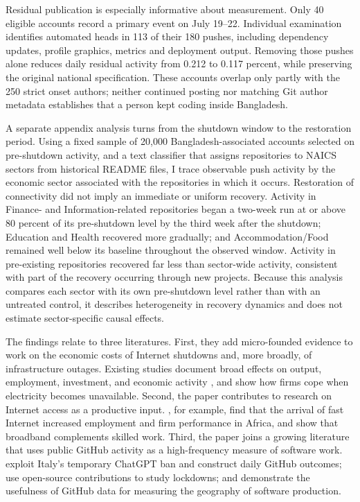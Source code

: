 Residual publication is especially informative about measurement. Only 40 eligible accounts record a primary event on July 19--22. Individual examination identifies automated heads in 113 of their 180 pushes, including dependency updates, profile graphics, metrics and deployment output. Removing those pushes alone reduces daily residual activity from 0.212 to 0.117 percent, while preserving the original national specification. These accounts overlap only partly with the 250 strict onset authors; neither continued posting nor matching Git author metadata establishes that a person kept coding inside Bangladesh.

A separate appendix analysis turns from the shutdown window to the restoration period. Using a fixed sample of 20,000 Bangladesh-associated accounts selected on pre-shutdown activity, and a text classifier that assigns repositories to NAICS sectors from historical README files, I trace observable push activity by the economic sector associated with the repositories in which it occurs. Restoration of connectivity did not imply an immediate or uniform recovery. Activity in Finance- and Information-related repositories began a two-week run at or above 80 percent of its pre-shutdown level by the third week after the shutdown; Education and Health recovered more gradually; and Accommodation/Food remained well below its baseline throughout the observed window. Activity in pre-existing repositories recovered far less than sector-wide activity, consistent with part of the recovery occurring through new projects. Because this analysis compares each sector with its own pre-shutdown level rather than with an untreated control, it describes heterogeneity in recovery dynamics and does not estimate sector-specific causal effects.

The findings relate to three literatures. First, they add micro-founded evidence to work on the economic costs of Internet shutdowns and, more broadly, of infrastructure outages. Existing studies document broad effects on output, employment, investment, and economic activity \citep*{tagat2024,gunsilius2023}, and \citet{allcott2016} show how firms cope when electricity becomes unavailable. Second, the paper contributes to research on Internet access as a productive input. \citet{hjort2019}, for example, find that the arrival of fast Internet increased employment and firm performance in Africa, and \citet{akerman2015} show that broadband complements skilled work. Third, the paper joins a growing literature that uses public GitHub activity as a high-frequency measure of software work. \citet{kreitmeir2024} exploit Italy's temporary ChatGPT ban and construct daily GitHub outcomes; \citet{hu2023} use open-source contributions to study lockdowns; and \citet{wachs2022} demonstrate the usefulness of GitHub data for measuring the geography of software production.

